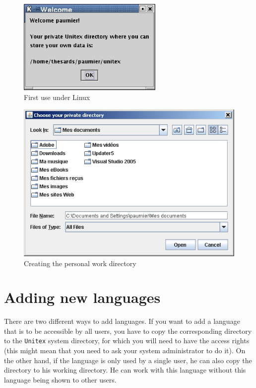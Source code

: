 \begin{figure}[h]
\begin{center}
\includegraphics[width=7cm]{resources/img/fig1-2.png}
\caption{First use under Linux}
\end{center}
\end{figure}

\begin{figure}[h]
\begin{center}
\includegraphics[width=13cm]{resources/img/fig1-3.png}
\caption{Creating the personal work
directory\label{fig-creation-personal-directory}}
\end{center}
\end{figure}


\section{Adding new languages}

\bigskip
\noindent There are two different ways to add languages. If you want to add 
a language that is to be accessible by all  users, you have to copy the 
corresponding directory to the \verb+Unitex+ system directory, for which 
you will need to have the access rights  (this might mean that you need to 
ask your system administrator to do it). On the other hand, if the language 
is only used by a single user, he can also copy the directory to his working 
directory. He can work with this language without this language being shown to other users.


